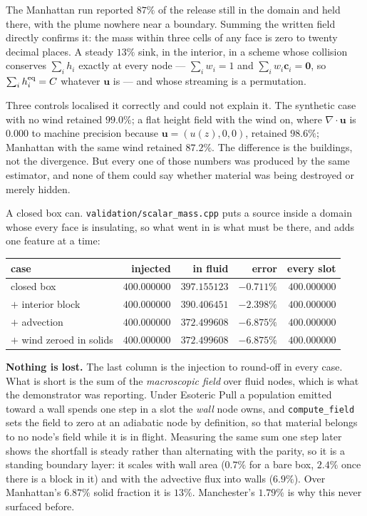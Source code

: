 \documentclass[11pt,a4paper]{article}
\newcommand{\ci}{\bm{c}_i}
\newcommand{\uu}{\bm{u}}
\begin{document}
The Manhattan run reported $87\%$ of the release still in the domain and held
there, with the plume nowhere near a boundary. Summing the written field
directly confirms it: the mass within three cells of any face is zero to twenty
decimal places. A steady $13\%$ sink, in the interior, in a scheme whose
collision conserves $\sum_i h_i$ exactly at every node --- $\sum_i w_i = 1$ and
$\sum_i w_i \ci = \bm{0}$, so $\sum_i h_i^{\rm eq} = C$ whatever $\uu$ is --- and
whose streaming is a permutation.

Three controls localised it correctly and could not explain it. The synthetic
case with no wind retained $99.0\%$; a flat height field with the wind on, where
$\nabla\!\cdot\!\uu$ is $0.000$ to machine precision because $\uu=(u(z),0,0)$,
retained $98.6\%$; Manhattan with the same wind retained $87.2\%$. The
difference is the buildings, not the divergence. But every one of those numbers
was produced by the same estimator, and none of them could say whether material
was being destroyed or merely hidden.

A closed box can. \texttt{validation/scalar\_mass.cpp} puts a source inside a
domain whose every face is insulating, so what went in is what must be there,
and adds one feature at a time:

\begin{center}
\begin{tabular}{lrrrr}
\toprule
case & injected & in fluid & error & every slot \\
\midrule
closed box            & $400.000000$ & $397.155123$ & $-0.711\%$ & $400.000000$ \\
$+$ interior block    & $400.000000$ & $390.406451$ & $-2.398\%$ & $400.000000$ \\
$+$ advection         & $400.000000$ & $372.499608$ & $-6.875\%$ & $400.000000$ \\
$+$ wind zeroed in solids & $400.000000$ & $372.499608$ & $-6.875\%$ & $400.000000$ \\
\bottomrule
\end{tabular}
\end{center}

\noindent \textbf{Nothing is lost.} The last column is the injection to
round-off in every case. What is short is the sum of the \emph{macroscopic
field} over fluid nodes, which is what the demonstrator was reporting. Under
Esoteric Pull a population emitted toward a wall spends one step in a slot the
\emph{wall} node owns, and \texttt{compute\_field} sets the field to zero at an
adiabatic node by definition, so that material belongs to no node's field while
it is in flight. Measuring the same sum one step later shows the shortfall is
steady rather than alternating with the parity, so it is a standing boundary
layer: it scales with wall area ($0.7\%$ for a bare box, $2.4\%$ once there is a
block in it) and with the advective flux into walls ($6.9\%$). Over Manhattan's
$6.87\%$ solid fraction it is $13\%$. Manchester's $1.79\%$ is why this never
surfaced before.
\end{document}
